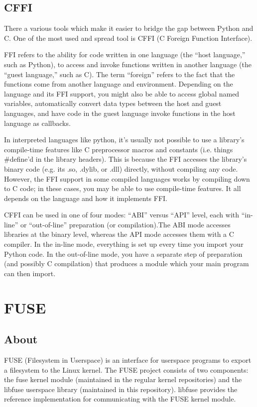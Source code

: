   \subsection{CFFI}
    There a various tools which make it easier to bridge the gap between Python and C. One of the most used and spread tool is CFFI (C Foreign Function Interface).
    
    FFI refers to the ability for code written in one language (the “host language,” such as Python), to access and invoke functions written in another language (the “guest language,” such as C). The term “foreign” refers to the fact that the functions come from another language and environment.
    Depending on the language and its FFI support, you might also be able to access global named variables, automatically convert data types between the host and guest languages, and have code in the guest language invoke functions in the host language as callbacks.
    
    In interpreted languages like python, it’s usually not possible to use a library’s compile-time features like C preprocessor macros and constants (i.e. things #define’d in the library headers). This is because the FFI accesses the library’s binary code (e.g. its .so, .dylib, or .dll) directly, without compiling any code.
    However, the FFI support in some compiled languages works by compiling down to C code; in these cases, you may be able to use compile-time features. It all depends on the language and how it implements FFI.
    
    CFFI can be used in one of four modes: “ABI” versus “API” level, each with “in-line” or “out-of-line” preparation (or compilation).The ABI mode accesses libraries at the binary level, whereas the API mode accesses them with a C compiler.
    In the in-line mode, everything is set up every time you import your Python code. In the out-of-line mode, you have a separate step of preparation (and possibly C compilation) that produces a module which your main program can then import.
    
    
   
  \section{FUSE}
     \subsection{About}
       FUSE (Filesystem in Userspace) is an interface for userspace programs to export a filesystem to the Linux kernel. The FUSE project consists of two components: the fuse kernel module (maintained in the regular kernel repositories) and the libfuse userspace library (maintained in this repository). libfuse provides the reference implementation for communicating with the FUSE kernel module.

